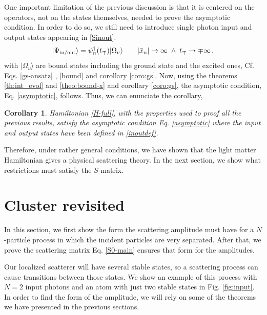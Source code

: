 \documentclass[notitlepage, prx, preprint, amsmath,superscriptaddress,amssymb]{revtex4-1}
\newtheorem{corollary}{Corollary}[section]
\begin{document}
One important limitation of the previous discussion is that it is centered on the operators, not on the states themselves, needed to prove the asymptotic condition.  
In order to do so,  we still need to introduce  single photon input and output states appearing in \eqref{Sinout}.
\begin{equation}
\label{inoutdef}
| \Psi_{\rm in / out} \rangle = 
\psi_n^\dagger (t_\mp) | \Omega_\nu  \rangle
\qquad  \vert \bar x_n \vert \to \infty \; \wedge \;  t_\mp \to \mp \infty \, .
\end{equation}
with $\vert \Omega_\nu \rangle$ are bound states including the ground state and the excited ones,  Cf. Eqs. \eqref{gs-ansatz} , \eqref{bound} and corollary \ref{coro:gs}.  
Now, using  the   theorems \ref{th:int_evol}  and  \ref{theo:bound-x} and  corollary \ref{coro:gs},  the asymptotic condition, Eq. \eqref{asymptotic}, follows.  Thus, we can enunciate the corollary,

\begin{corollary}
\label{coro:asymp}
Hamiltonian \eqref{H-full}, with the properties used to proof all the previous results, satisfy the asymptotic condition Eq. \eqref{asymptotic} where the input and output states have been defined in \eqref{inoutdef}.  
\end{corollary}


Therefore, under rather general conditions, we have shown that the light matter Hamiltonian gives a physical scattering theory.  In the next section, we show what restrictions must satisfy the $S$-matrix.


\section{Cluster revisited}

In this section, we first show the form the scattering amplitude must have for a $N$-particle process in which the incident particles are very separated. After that, we prove the scattering matrix Eq. \eqref{S0-main} ensures that form for the amplitudes.

Our localized scatterer will have several stable states, so a scattering process can cause transitions between those states. We show an example of this process with $N=2$ input photons and an atom with just two stable states in Fig. \ref{fig:input}. In order to find the form of the amplitude, we will rely on some of the theorems we have presented in the previous sections.
\end{document}
